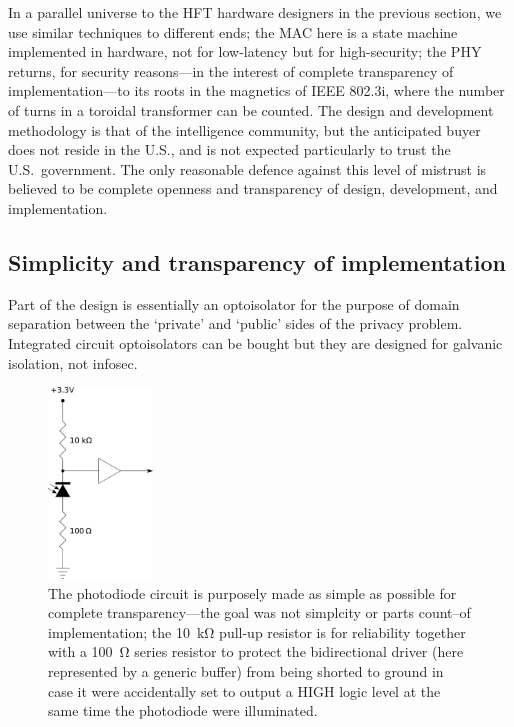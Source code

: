 \documentclass[conference]{IEEEtran}
\begin{document}
In a parallel universe to the HFT hardware designers in the previous section,
we use similar techniques to different ends; the MAC here is a state machine
implemented in hardware, not for low-latency but for high-security; the PHY
returns, for security reasons---in the interest of complete transparency of
implementation---to its roots in the magnetics of IEEE 802.3i, where the
number of turns in a toroidal transformer can be counted. The design and
development methodology is that of the intelligence community, but the
anticipated buyer does not reside in the U.S., and is not expected
particularly to trust the U.S.\ government. The only reasonable defence
against this level of mistrust is believed to be complete openness and
transparency of design, development, and implementation.

\subsection{Simplicity and transparency of implementation}

Part of the design is essentially an optoisolator for the purpose of domain
separation between the `private' and `public' sides of the privacy problem.
Integrated circuit optoisolators can be bought but they are designed for
galvanic isolation, not infosec.

\begin{figure}[!t]
    \centering
	\includegraphics[height=2in]{graphics/photodiode_pullup_and_GPIO_protection.png}
	\caption{The photodiode circuit is purposely made as simple as possible
        for complete transparency---the goal was not simplcity or parts
        count--of implementation; the \SI{10}{\kilo\ohm} pull-up resistor is
        for reliability together with a \SI{100}{\ohm} series resistor to
        protect the bidirectional driver (here represented by a generic
        buffer) from being shorted to ground in case it were accidentally set
        to output a HIGH logic level at the same time the photodiode were
        illuminated.}
	\label{figure:photodiode_pullup}
\end{figure}
\end{document}

